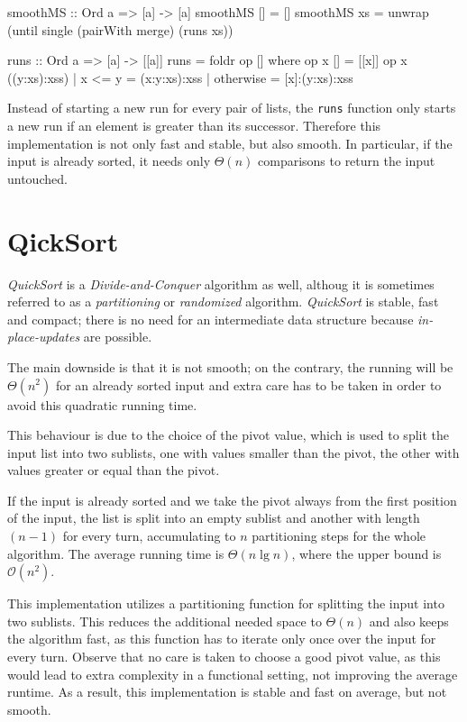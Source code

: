 \begin{haskellcode}
smoothMS :: Ord a => [a] -> [a]
smoothMS [] = []
smoothMS xs = unwrap (until single (pairWith merge) (runs xs))

runs :: Ord a => [a] -> [[a]]
runs = foldr op []
    where op x [] = [[x]]
          op x ((y:xs):xss) | x <= y = (x:y:xs):xss
                            | otherwise = [x]:(y:xs):xss
\end{haskellcode}

Instead of starting a new run for every pair of lists, the \texttt{runs} function only starts a new run if an element is greater than its successor.
Therefore this implementation is not only fast and stable, but also smooth. In particular, if the input is already sorted, it needs only $\Theta(n)$ comparisons to return the input untouched.

\section{QickSort}

\emph{QuickSort} is a \emph{Divide-and-Conquer} algorithm as well, althoug it is sometimes referred to as a \emph{partitioning} or \emph{randomized} algorithm.
\emph{QuickSort} is stable, fast and compact; there is no need for an intermediate data structure because \emph{in-place-updates} are possible.

The main downside is that it is not smooth; on the contrary, the running will be $\Theta (n^2)$ for an already sorted input and extra care has to be taken in order to avoid this quadratic running time.

This behaviour is due to the choice of the pivot value, which is used to split the input list into two sublists, one with values smaller than the pivot, the other with values greater or equal than the pivot.

If the input is already sorted and we take the pivot always from the first position of the input, the list is split into an empty sublist and another with length $(n-1)$ for every turn, accumulating to $n$ partitioning steps for the whole algorithm.
The average running time is $\Theta (n \lg n)$, where the upper bound is $\mathcal{O}(n^2)$.

\begin{impl} \label{impl:qshaskell}
This implementation utilizes a partitioning function for splitting the input into two sublists. This reduces the additional needed space to $\Theta(n)$ and also keeps the algorithm fast, as this function has to iterate only once over the input for every turn.
Observe that no care is taken to choose a good pivot value, as this would lead to extra complexity in a functional setting, not improving the average runtime. As a result, this implementation is stable and fast on average, but not smooth.
\end{impl}

